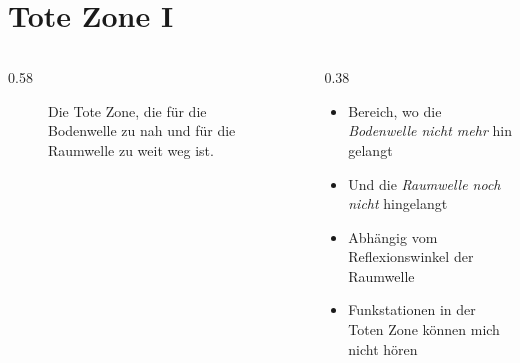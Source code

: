 
\section{Tote Zone I}
\label{section:tote_zone_1}


\begin{frame}
\begin{columns}
    \begin{column}{0.58\textwidth}
    
\begin{figure}
    \caption{\scriptsize Die Tote Zone, die für die Bodenwelle zu nah und für die Raumwelle zu weit weg ist.}
    \label{n_ionosphaere_tote_zone}
\end{figure}


    \end{column}
   \begin{column}{0.38\textwidth}
       \begin{itemize}
        \item Bereich, wo die \emph{Bodenwelle nicht mehr} hin gelangt
        \item Und die \emph{Raumwelle noch nicht} hingelangt
        \item Abhängig vom Reflexionswinkel der Raumwelle
        \item Funkstationen in der Toten Zone können mich nicht hören
  \end{itemize}

   \end{column}
\end{columns}

\end{frame}

